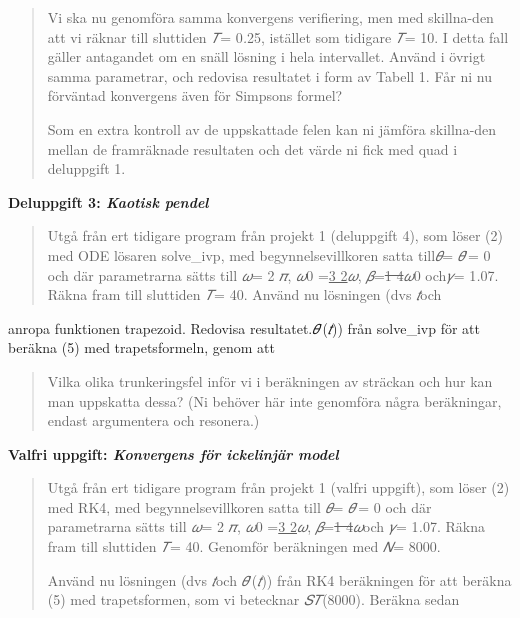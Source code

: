 \documentclass[
]{article}
\begin{document}
\begin{quote}
Vi ska nu genomföra samma konvergens verifiering, men med skillna-den
att vi räknar till sluttiden \emph{𝑇}= 0\emph{.}25, istället som
tidigare \emph{𝑇}= 10. I detta fall gäller antagandet om en snäll
lösning i hela intervallet. Använd i övrigt samma parametrar, och
redovisa resultatet i form av Tabell 1. Får ni nu förväntad konvergens
även för Simpsons formel?

Som en extra kontroll av de uppskattade felen kan ni jämföra skillna-den
mellan de framräknade resultaten och det värde ni fick med quad i
deluppgift 1.
\end{quote}

\textbf{Deluppgift 3: \emph{Kaotisk pendel}}

\begin{quote}
Utgå från ert tidigare program från projekt 1 (deluppgift 4), som löser
(2) med ODE lösaren solve\_ivp, med begynnelsevillkoren satta
till\emph{𝜃}= \emph{𝜃}′= 0 och där parametrarna sätts till \emph{𝜔}= 2
\emph{𝜋}, \emph{𝜔}0 =\uline{3 2}\emph{𝜔}, \emph{𝛽}=\sout{1 4}\emph{𝜔}0
och\emph{𝛾}= 1\emph{.}07. Räkna fram till sluttiden \emph{𝑇}= 40. Använd
nu lösningen (dvs \emph{𝑡}och
\end{quote}

anropa funktionen trapezoid. Redovisa resultatet.\emph{𝜃}′(\emph{𝑡}))
från solve\_ivp för att beräkna (5) med trapetsformeln, genom att

\begin{quote}
Vilka olika trunkeringsfel inför vi i beräkningen av sträckan och hur
kan man uppskatta dessa? (Ni behöver här inte genomföra några
beräkningar, endast argumentera och resonera.)
\end{quote}

\textbf{Valfri uppgift: \emph{Konvergens för ickelinjär model}}

\begin{quote}
Utgå från ert tidigare program från projekt 1 (valfri uppgift), som
löser (2) med RK4, med begynnelsevillkoren satta till \emph{𝜃}=
\emph{𝜃}′= 0 och där parametrarna sätts till \emph{𝜔}= 2 \emph{𝜋},
\emph{𝜔}0 =\uline{3 2}\emph{𝜔}, \emph{𝛽}=\sout{1 4}\emph{𝜔}och \emph{𝛾}=
1\emph{.}07. Räkna fram till sluttiden \emph{𝑇}= 40. Genomför
beräkningen med \emph{𝑁}= 8000.

Använd nu lösningen (dvs \emph{𝑡}och \emph{𝜃}′(\emph{𝑡})) från RK4
beräkningen för att beräkna (5) med trapetsformen, som vi betecknar
\emph{𝑆𝑇}(8000). Beräkna sedan
\end{quote}
\end{document}
